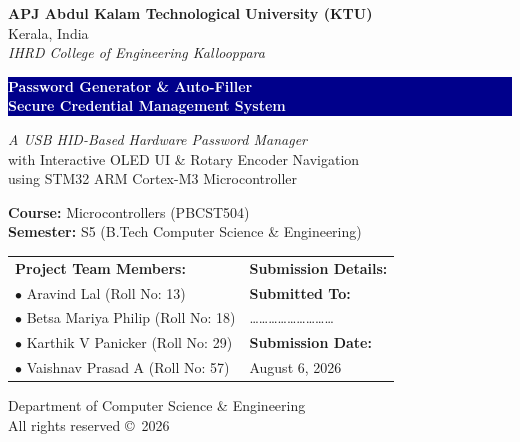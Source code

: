 \documentclass[12pt,a4paper]{article}
\begin{document}

\thispagestyle{empty}

\begin{center}
\vspace*{0.2cm}

{\Large \textbf{APJ Abdul Kalam Technological University (KTU)}} \\[0.2cm]
{\normalsize Kerala, India} \\[0.1cm]
{\normalsize \textit{IHRD College of Engineering Kallooppara}} \\

\vfill

\colorbox{darkblue}{%
  \parbox{0.92\textwidth}{%
    \centering
    \vspace{0.6cm}
    {\LARGE \textbf{\textcolor{white}{Password Generator \& Auto-Filler}}} \\[0.2cm]
    {\Large \textbf{\textcolor{white}{Secure Credential Management System}}} \\
    \vspace{0.6cm}
  }%
}

\vfill

{\large \textit{A USB HID-Based Hardware Password Manager}} \\[0.15cm]
{\normalsize with Interactive OLED UI \& Rotary Encoder Navigation} \\[0.1cm]
{\normalsize using STM32 ARM Cortex-M3 Microcontroller} \\

\vfill

{\normalsize \textbf{Course:} Microcontrollers (PBCST504)} \\[0.1cm]
{\normalsize \textbf{Semester:} S5 (B.Tech Computer Science \& Engineering)} \\

\vfill

\begin{table}[h!]
\centering
\begin{tabular}{p{} p{}}
\textbf{\large Project Team Members:} & \textbf{\large Submission Details:} \\[0.2cm]
$\bullet$ Aravind Lal (Roll No: 13) & \textbf{Submitted To:} \\[0.1cm]
$\bullet$ Betsa Mariya Philip (Roll No: 18) & \dots\dots\dots\dots\dots\dots\dots\dots\dots \\[0.2cm]
$\bullet$ Karthik V Panicker (Roll No: 29) & \textbf{Submission Date:} \\[0.1cm]
$\bullet$ Vaishnav Prasad A (Roll No: 57) & August 6, 2026 \\
\end{tabular}
\end{table}

\vfill

{\footnotesize Department of Computer Science \& Engineering} \\
{\footnotesize All rights reserved \copyright~2026}

\end{center}
\end{document}
